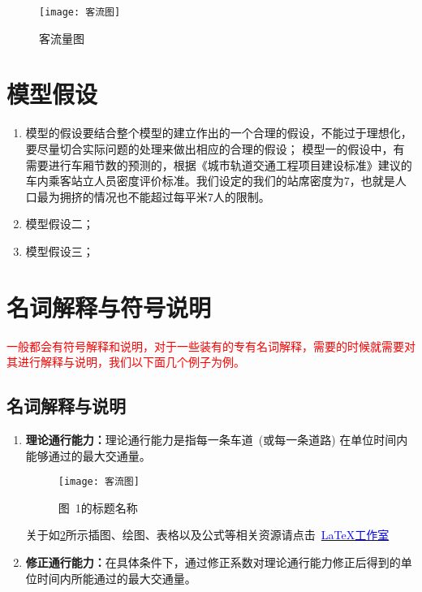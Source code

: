 \documentclass[12pt,a4paper]{mcmthesis}
\newcommand\wordc[1]{\textbf{#1}}
\begin{document}
\begin{figure}[h!t]
	\centerline{\texttt{[image: 客流图]}\quad
	}
	\caption{\song\wuhao
		客流量图}
	\label{fig:客流量}
\end{figure}


\section{模型假设}
\begin{enumerate}
  \item 模型的假设要结合整个模型的建立作出的一个合理的假设，不能过于理想化，要尽量切合实际问题的处理来做出相应的合理的假设；
  {模型一的假设中，有需要进行车厢节数的预测的，根据《城市轨道交通工程项目建设标准》建议的车内乘客站立人员密度评价标准。我们设定的我们的站席密度为7，也就是人口最为拥挤的情况也不能超过每平米7人的限制。}
  \item 模型假设二；
  \item 模型假设三；
\end{enumerate}

\section{名词解释与符号说明}

\textcolor{red}{一般都会有符号解释和说明，对于一些装有的专有名词解释，需要的时候就需要对其进行解释与说明，我们以下面几个例子为例。}

\subsection{名词解释与说明}
\begin{enumerate}
\item \wordc{理论通行能力：}理论通行能力是指每一条车道~(或每一条道路) 在单位时间内
能够通过的最大交通量。

\begin{figure}[h!t]
\centerline{\texttt{[image: 客流图]}\quad
}
\vspace{-4em}
\caption{\song\wuhao
图~1的标题名称}
\label{fig:4-1}
\end{figure}

关于如\ref{fig:4-1}所示插图、绘图、表格以及公式等相关资源请点击~\href{http://www.latexstudio.net}{\textcolor{blue}{\LaTeX{}工作室}}

\item \wordc{修正通行能力：}在具体条件下，通过修正系数对理论通行能力修正后得到的单
位时间内所能通过的最大交通量。

\end{enumerate}
\end{document}
